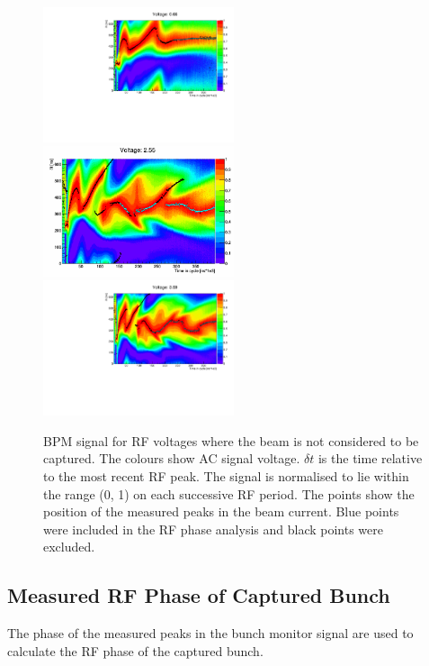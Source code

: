 \documentclass{paper}
\begin{document}
\begin{figure}
		\includegraphics[width=0.5\textwidth]{images/V=1_33_fitted_bpm_to_rf_deltas}
		\includegraphics[width=0.5\textwidth]{images/V=5_09_fitted_bpm_to_rf_deltas}
		\includegraphics[width=0.5\textwidth]{images/V=7_18_fitted_bpm_to_rf_deltas}
	\caption{BPM signal for RF voltages where the beam is not considered to be
           captured. The colours show AC signal voltage. $\delta t$ is the time
           relative to the most recent RF peak. The signal is normalised to
           lie within the range (0, 1) on each successive RF period.
           The points show the position of the measured peaks in the beam 
           current. Blue points were included in the RF phase analysis and black
           points were excluded.}
	\label{fig:bm_signal_periodic}
\end{figure}

\subsection{Measured RF Phase of Captured Bunch}
The phase of the measured peaks in the bunch monitor signal are used to 
calculate the RF phase of the captured bunch.
\end{document}
